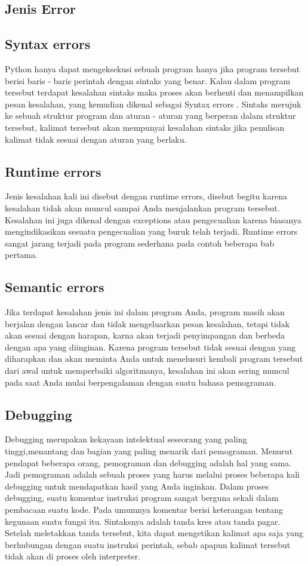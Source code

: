 \subsection{Jenis Error}
\subsection{Syntax errors}
Python hanya dapat mengeksekusi sebuah program hanya jika program tersebut
berisi baris - baris perintah dengan sintaks yang benar. Kalau dalam program tersebut terdapat kesalahan sintaks maka proses akan berhenti dan menampilkan 
pesan kesalahan, yang kemudian dikenal sebagai Syntax errors . Sintaks merujuk ke sebuah struktur program dan aturan - aturan yang berperan dalam struktur 
tersebut, kalimat tersebut akan mempunyai kesalahan sintaks jika penulisan kalimat tidak sesuai dengan aturan yang berlaku. 
\subsection{Runtime errors}
Jenis kesalahan kali ini disebut dengan runtime errors, disebut begitu karena kesalahan tidak akan muncul sampai Anda menjalankan program tersebut. Kesalahan ini juga dikenal dengan exceptions atau pengecualian karena biasanya mengindikasikan sesuatu pengecualian yang buruk telah terjadi. Runtime errors sangat jarang terjadi pada program sederhana pada contoh 
beberapa bab pertama.
\subsection{Semantic errors}
Jika terdapat kesalahan jenis ini dalam program Anda, program masih akan berjalan dengan lancar dan tidak mengeluarkan pesan kesalahan, tetapi tidak
akan sesuai dengan harapan, karna akan terjadi penyimpangan dan berbeda dengan 
apa yang diinginan. Karena program tersebut tidak sesuai dengan yang diharapkan dan akan meminta
Anda untuk menelusuri kembali program tersebut dari awal untuk memperbaiki
algoritmanya, kesalahan ini akan sering muncul pada saat Anda mulai berpengalaman dengan suatu bahasa pemograman.
\subsection{Debugging}
Debugging merupakan kekayaan intelektual seseorang yang paling tinggi,menantang dan bagian yang paling menarik dari pemograman. Menurut pendapat beberapa orang, pemograman dan debugging adalah hal yang
sama. Jadi pemograman adalah sebuah proses yang harus melalui proses beberapa kali debugging untuk mendapatkan hasil yang Anda inginkan. Dalam proses debugging, suatu komentar instruksi program sangat berguna sekali dalam pembacaan suatu kode. Pada umumnya komentar berisi keterangan tentang
kegunaan suatu fungsi itu. Sintaksnya adalah tanda kres atau tanda pagar. Setelah meletakkan tanda tersebut, kita dapat mengetikan kalimat apa saja yang
berhubungan dengan suatu instruksi perintah, sebab apapun kalimat tersebut tidak
akan di proses oleh interpreter. 

